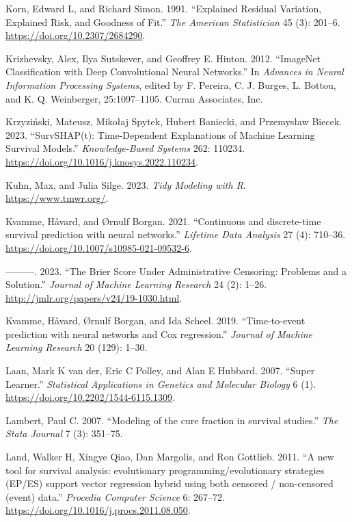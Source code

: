 \documentclass[
  letterpaper,
  krantz2]{style/krantz}
\newlength{\cslhangindent}
\newenvironment{CSLReferences}[2] %
 {\begin{list}{}{%
  \setlength{\itemindent}{0pt}
  \setlength{\leftmargin}{0pt}
  \setlength{\parsep}{0pt}
  \ifodd #1
   \setlength{\leftmargin}{\cslhangindent}
   \setlength{\itemindent}{-1\cslhangindent}
  \fi
  \setlength{\itemsep}{#2\baselineskip}}}
 {\end{list}}
\begin{document}
\begin{CSLReferences}{1}{0}
Korn, Edward L, and Richard Simon. 1991. {``{Explained Residual
Variation, Explained Risk, and Goodness of Fit}.''} \emph{The American
Statistician} 45 (3): 201--6. \url{https://doi.org/10.2307/2684290}.

Krizhevsky, Alex, Ilya Sutskever, and Geoffrey E. Hinton. 2012.
{``{ImageNet Classification with Deep Convolutional Neural Networks}.''}
In \emph{Advances in Neural Information Processing Systems}, edited by
F. Pereira, C. J. Burges, L. Bottou, and K. Q. Weinberger,
25:1097--1105. Curran Associates, Inc.

Krzyziński, Mateusz, Mikołaj Spytek, Hubert Baniecki, and Przemysław
Biecek. 2023. {``SurvSHAP(t): Time-Dependent Explanations of Machine
Learning Survival Models.''} \emph{Knowledge-Based Systems} 262: 110234.
\url{https://doi.org/10.1016/j.knosys.2022.110234}.

Kuhn, Max, and Julia Silge. 2023. \emph{Tidy Modeling with {R}}.
\url{https://www.tmwr.org/}.

Kvamme, Håvard, and Ørnulf Borgan. 2021. {``{Continuous and
discrete-time survival prediction with neural networks}.''}
\emph{Lifetime Data Analysis} 27 (4): 710--36.
\url{https://doi.org/10.1007/s10985-021-09532-6}.

---------. 2023. {``The Brier Score Under Administrative Censoring:
Problems and a Solution.''} \emph{Journal of Machine Learning Research}
24 (2): 1--26. \url{http://jmlr.org/papers/v24/19-1030.html}.

Kvamme, Håvard, Ørnulf Borgan, and Ida Scheel. 2019. {``{Time-to-event
prediction with neural networks and Cox regression}.''} \emph{Journal of
Machine Learning Research} 20 (129): 1--30.

Laan, Mark K van der, Eric C Polley, and Alan E Hubbard. 2007. {``{Super
Learner}.''} \emph{Statistical Applications in Genetics and Molecular
Biology} 6 (1). \url{https://doi.org/10.2202/1544-6115.1309}.

Lambert, Paul C. 2007. {``{Modeling of the cure fraction in survival
studies}.''} \emph{The Stata Journal} 7 (3): 351--75.

Land, Walker H, Xingye Qiao, Dan Margolis, and Ron Gottlieb. 2011. {``{A
new tool for survival analysis: evolutionary programming/evolutionary
strategies (EP/ES) support vector regression hybrid using both censored
/ non-censored (event) data}.''} \emph{Procedia Computer Science} 6:
267--72. \url{https://doi.org/10.1016/j.procs.2011.08.050}.


\end{CSLReferences}
\end{document}
